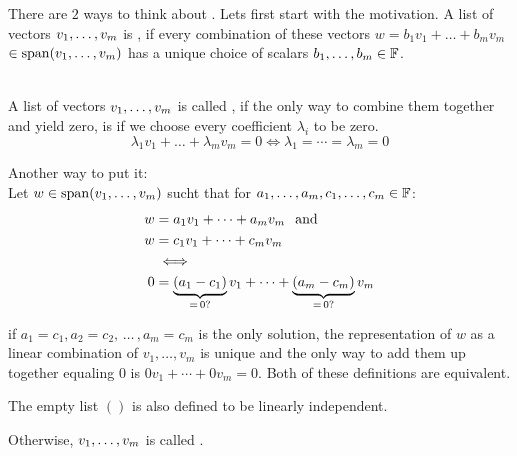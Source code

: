 \setcounter{thm}{14}
\begin{mydef} 
  There are $2$ ways to think about . Lets first start with the motivation. A list of vectors $v_1, \dots, v_m$ is \qt{\lid}, if every combination of these vectors $w = b_1v_1 + \dots+ b_mv_m$ $\in \operatorname{span} (v_1, \dots, v_m)$ has a unique choice of scalars $b_1, \dots, b_m \in \mathbb{F}$.

   \\
  A list of vectors $v_1, \dots, v_m$ is called \lid, if the only way to combine them together and yield zero, is if we choose every coefficient $\lambda_i$ to be zero.
  \begin{equation}
    \lambda_1v_1 + \dots + \lambda_mv_m = 0 \iff \lambda_1 = \cdots = \lambda_m = 0
  \end{equation}

  Another way to put it:\\
  Let $w\in \operatorname{span} (v_1, \dots, v_m)$ sucht that for $a_1, \dots, a_m, c_1, \dots, c_m \in \mathbb{F}$:
  \begin{equation}
    \begin{aligned}
      w & =a_1 v_1 + \cdots + a_m v_m \;\;\, \text{and}\;\; \\
      w & =c_1 v_1 + \cdots + c_m v_m \\
      & \iff \\
      0 & = \underbrace{(a_1 - c_1)}_{= \, 0\text{?}} v_1 + \cdots + \underbrace{(a_m -c_m)}_{= \, 0\text{?}} v_m
    \end{aligned}
  \end{equation}

  if $a_1 = c_1, a_2 = c_2, \, \dots \, , a_m = c_m$ is the only solution, the representation of $w$ as a linear combination of $v_1, \ldots, v_m$ is unique and the only way to add them up together equaling $0$ is $0v_1+\cdots+0v_m=0$. Both of these definitions are equivalent.

  The empty list $()$ is also defined to be linearly independent.
\end{mydef}


\begin{mydef} 
  Otherwise, $v_1, \dots, v_m$ is called .
\end{mydef}



